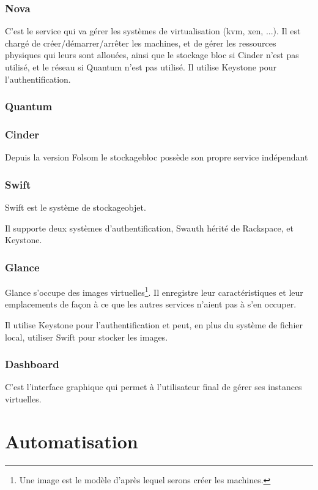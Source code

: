 \documentclass[a4paper,oneside]{report}
\begin{document}
\subsubsection{Nova}
C'est le service qui va gérer les systèmes de \gls{virtualisation} (\gls{kvm}, \gls{xen}, ...).
Il est chargé de créer/démarrer/arrêter les machines, et de gérer les ressources physiques qui leurs sont allouées, ainsi que le stockage bloc si Cinder n'est pas utilisé, et le réseau si Quantum n'est pas utilisé.\newline
Il utilise Keystone pour l'authentification.


\subsubsection{Quantum}


\subsubsection{Cinder}
Depuis la version Folsom le \gls{stockagebloc} possède son propre service indépendant 



\subsubsection{Swift}
Swift est le système de \gls{stockageobjet}. 

Il supporte deux systèmes d'authentification, Swauth hérité de Rackspace, et Keystone.

\subsubsection{Glance}
Glance s'occupe des images virtuelles\footnote{Une image est le modèle d'après lequel serons créer les machines.}.
Il enregistre leur caractéristiques et leur emplacements de façon à ce que les autres services n'aient pas à s'en occuper.

Il utilise Keystone pour l'authentification et peut, en plus du système de fichier local, utiliser Swift pour stocker les images.

\subsubsection{Dashboard}
C'est l'interface graphique qui permet à l'utilisateur final de gérer ses instances virtuelles.

\section{Automatisation}
\end{document}
